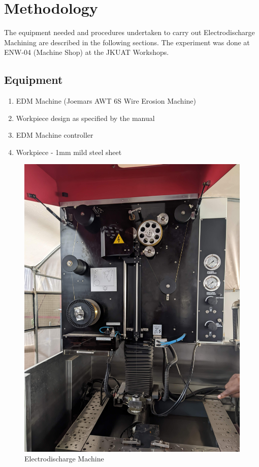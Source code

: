 \chapter{Methodology}
\lhead{\leftmark}
The equipment needed and procedures undertaken to carry out Electrodischarge Machining are described in the following sections. The experiment was done at ENW-04 (Machine Shop) at the JKUAT Workshops.
\section{Equipment}
\begin{enumerate}
\item EDM Machine (Joemars AWT 6S Wire Erosion Machine)
\item Workpiece design as specified by the manual
\item EDM Machine controller 
\item Workpiece - 1mm mild steel sheet
\end{enumerate}
\begin{figure}[h!]
	\centering
	\includegraphics[width=0.7\linewidth]{Figures/edmmachine}
	\caption[EDM Machine]{Electrodischarge Machine}
	\label{fig:scanning}
\end{figure}

